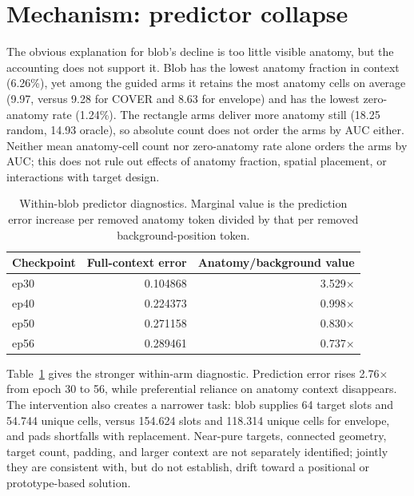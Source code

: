 \documentclass{article}
\begin{document}
\section{Mechanism: predictor collapse}

The obvious explanation for blob's decline is too little visible anatomy, but
the accounting does not support it. Blob has the lowest anatomy fraction in context
(6.26\%), yet among the guided arms it retains the most anatomy cells on
average (9.97, versus 9.28 for COVER and 8.63 for envelope) and has the lowest
zero-anatomy rate (1.24\%). The rectangle arms deliver more anatomy still
(18.25 random, 14.93 oracle), so absolute count does not order the arms by AUC
either. Neither mean anatomy-cell count nor zero-anatomy rate alone orders the
arms by AUC; this does not rule out effects of anatomy fraction, spatial
placement, or interactions with target design.

\begin{table}[t]
\centering
\small
\caption{Within-blob predictor diagnostics. Marginal value is the prediction
error increase per removed anatomy token divided by that per removed
background-position token.}
\label{tab:collapse}
\begin{tabular}{lrr}
\toprule
Checkpoint & Full-context error & Anatomy/background value \\
\midrule
ep30 & 0.104868 & 3.529$\times$ \\
ep40 & 0.224373 & 0.998$\times$ \\
ep50 & 0.271158 & 0.830$\times$ \\
ep56 & 0.289461 & 0.737$\times$ \\
\bottomrule
\end{tabular}
\end{table}

Table~\ref{tab:collapse} gives the stronger within-arm diagnostic. Prediction
error rises 2.76$\times$ from epoch 30 to 56, while preferential reliance on
anatomy context disappears. The intervention also creates a narrower task:
blob supplies 64 target slots and 54.744 unique cells, versus 154.624 slots and
118.314 unique cells for envelope, and pads shortfalls with replacement.
Near-pure targets, connected geometry, target count, padding, and larger
context are not separately identified; jointly they are consistent with, but do
not establish, drift toward a positional or prototype-based solution.
\end{document}
